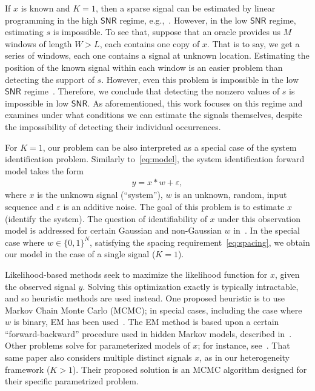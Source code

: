 \documentclass[english,11pt]{article}
\newcommand{\TODO}[1]{{\color{red}{[#1]}}}
\numberwithin{equation}{section}
\theoremstyle{plain}
\theoremstyle{definition}
\theoremstyle{remark}
\theoremstyle{plain}
\theoremstyle{remark}
\theoremstyle{plain}
\theoremstyle{plain}
\newcommand{\SNR}{{\textsf{SNR}}}
\begin{document}
If $x$ is known and $K=1$, then a sparse signal can be estimated by linear programming  in the high $\SNR$ regime, e.g.,~\cite{de2012exact,duval2015exact,bendory2016robust,bendory2017robust,bernstein2017deconvolution}. However, in the low $\SNR$ regime, estimating $s$ is impossible. To see that, suppose that an oracle provides us $M$ windows of length $W>L$, each contains one copy of $x$. That is to say, we get a series of windows, each one contains a signal at unknown location. 
Estimating the position of the known signal within each  window is an easier problem than detecting the support of $s$. 
However, even this problem is impossible in the low $\SNR$ regime~\cite{aguerrebere2016fundamental}. Therefore, we conclude that detecting the nonzero values of $s$ is impossible in low $\SNR$. As aforementioned, this work focuses on this regime and examines under what conditions we can estimate the signals themselves, despite the impossibility of detecting their individual occurrences.

For $K=1$, our problem can be also interpreted as a special case of the system identification problem. Similarly to~\eqref{eq:model}, the system identification forward model takes the form
\begin{eqnarray}
y = x\ast w + \varepsilon,  
\end{eqnarray} 
where $x$ is the unknown signal (``system''), $w$ is an unknown, random, input sequence and $\varepsilon$ is an additive noise.   
The goal of this problem is to estimate $x$ (identify the system). The question of identifiability of $x$ under
this observation model is addressed for certain Gaussian and non-Gaussian $w$ in~\cite{benveniste1980robust,kormylo1983identifiability}.
In the special case where $w\in\{0,1\}^N$, satisfying the spacing requirement~\eqref{eq:spacing}, we obtain our
model in the  case of a single signal ($K = 1$).

Likelihood-based methods seek to maximize the likelihood function for $x$,
given the observed signal $y$. Solving this optimization exactly is typically
intractable, and so heuristic methods are used instead. One proposed heuristic
 is to use Markov Chain Monte Carlo (MCMC); in special
cases, including the case where $w$ is binary, EM has been used~\cite{cappe1999simulation}.
The EM method is based upon a certain ``forward-backward'' procedure
used in hidden Markov models, described in~\cite{rabiner1989tutorial}. \TODO{We need to explain}
Other problems solve for parameterized models of $x$; for instance, see~\cite{andrieu2001bayesian}. 
That same paper also considers multiple distinct signals $x$, as in our heterogeneity framework ($K>1$). Their proposed
solution is an MCMC algorithm designed for their specific parametrized problem.
\end{document}

